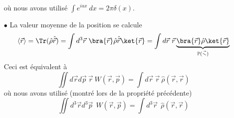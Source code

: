 \begin{itemize}
\begin{equation}
\begin{array}{ll}
\end{array}
\end{equation}
où nous avons utilisé $\int e^{iax}\ dx = 2\pi \delta(x)$.
\item[$\bullet$] La valeur moyenne de la position se calcule
\begin{equation}
\langle\vec{r}\rangle = \Tr(\hat{\rho}\hat{\vec{r}}) = \int d^3\vec{r}\ \bra{\vec{r}}\hat{\rho}\hat{\vec{r}}\ket{\vec{r}} = 
\int d\vec{r}\ \vec{r}\underbrace{\bra{\vec{r}}\hat{\rho}\ket{\vec{r}}}_{\mathbb{P(\vec{r})}}
\end{equation}
Ceci est équivalent à 
\begin{equation}
\iint d\vec{r}d\vec{p}\ \vec{r}\ W(\vec{r},\vec{p}) = \int d\vec{r}\ \vec{r}\ \hat{\rho}(\vec{r},\vec{r})
\end{equation}
où nous avons utilisé (montré lors de la propriété précédente)
\begin{equation}
\iint d^3\vec{r}d^3\vec{p}\ \ W(\vec{r},\vec{p}) = \int d^3\vec{r}\ \ \hat{\rho}(\vec{r},\vec{r})
\end{equation}


\end{itemize}
